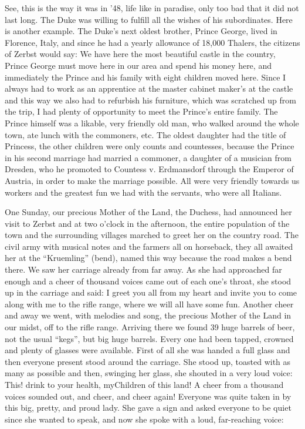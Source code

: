 See, this is the way it was in '48, life like in paradise, only too bad that it did not last long. The Duke was willing to fulfill all the wishes of his subordinates. Here is another example. The Duke's next oldest brother, Prince George, lived in Florence, Italy, and since he had a yearly allowance of 18,000 Thalers, the citizens of Zerbst would say: We have here the most beautiful castle in the country, Prince George must move here in our area and spend his money here, and immediately the Prince and his family with eight children moved here. Since I always had to work as an apprentice at the master cabinet maker's at the castle and this way we also had to refurbish his furniture, which was scratched up from the trip, I had plenty of opportunity to meet the Prince's entire family. The Prince himself was a likable, very friendly old man, who walked around the whole town, ate lunch with the commoners, etc. The oldest daughter had the title of Princess, the other children were only counts and countesses, because the Prince in his second marriage had married a commoner, a daughter of a musician from Dresden, who he promoted to Countess v. Erdmansdorf through the Emperor of Austria, in order to make the marriage possible. All were very friendly towards us workers and the greatest fun we had with the servants, who were all Italians.

One Sunday, our precious Mother of the Land, the Duchess, had announced her visit to Zerbst and at two o'clock in the afternoon, the entire population of the town and the surrounding villages marched to greet her on the country road. The civil army with musical notes and the farmers all on horseback, they all awaited her at the ``Kruemling'' (bend), named this way because the road makes a bend there. We saw her carriage already from far away. As she had approached far enough and a cheer of thousand voices came out of each one's throat, she stood up in the carriage and said: I greet you all from my heart and invite you to come along with me to the rifle range, where we will all have some fun. Another cheer and away we went, with melodies and song, the precious Mother of the Land in our midst, off to the rifle range. Arriving there we found 39 huge barrels of beer, not the usual ``kegs'', but big huge barrels. Every one had been tapped, crowned and plenty of glasses were available. First of all she was handed a full glass and then everyone present stood around the carriage. She stood up, toasted with as many as possible and then, swinging her glass, she shouted in a very loud voice: This! drink to your health, myChildren of this land! A cheer from a thousand voices sounded out, and cheer, and cheer again! Everyone was quite taken in by this big, pretty, and proud lady. She gave a sign and asked everyone to be quiet since she wanted to speak, and now she spoke with a loud, far-reaching voice:

